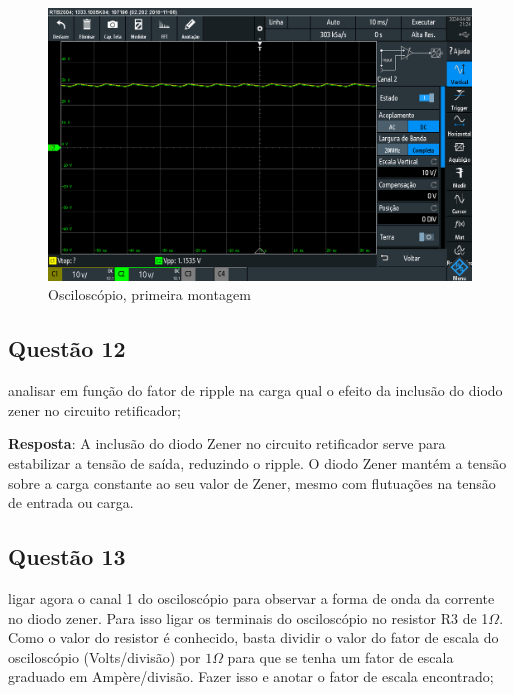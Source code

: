\documentclass{article}
\begin{document}
\begin{figure}[h!]
    \centering
    \includegraphics[width=12cm]{images/SCR06.PNG}
    \caption{Osciloscópio, primeira montagem}
\end{figure}

\subsection{Questão 12}

\begin{tcolorbox}[title=\large Questão 12, colback=red!5!white, colframe=red!75!black]
    \large
    analisar em função do fator de ripple na carga qual o efeito da inclusão do diodo zener no circuito retificador;
\end{tcolorbox}

\textbf{Resposta}: A inclusão do diodo Zener no circuito retificador serve para estabilizar a tensão de saída, reduzindo o ripple. O diodo Zener mantém a tensão sobre a carga constante ao seu valor de Zener, mesmo com flutuações na tensão de entrada ou carga.

\subsection{Questão 13}

\begin{tcolorbox}[title=\large Questão 13, colback=red!5!white, colframe=red!75!black]
    \large
    ligar agora o canal 1 do osciloscópio para observar a forma de onda da corrente no diodo zener. Para isso ligar os terminais do osciloscópio no resistor R3 de 1$\Omega$. Como o valor do resistor é conhecido, basta dividir o valor do fator de escala do osciloscópio (Volts/divisão) por $1\Omega$ para que se tenha um fator de escala graduado em Ampère/divisão. Fazer isso e anotar o fator de escala encontrado;
\end{tcolorbox}
\end{document}
